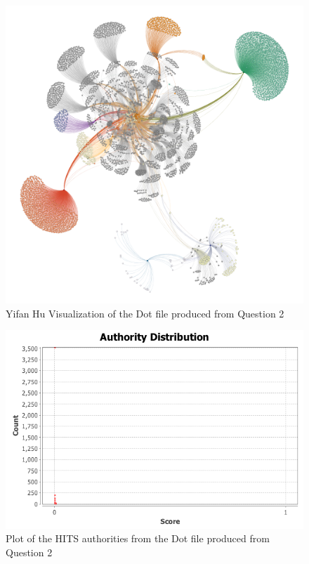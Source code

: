 \documentclass[letterpaper,11pt]{article}
\begin{document}
\begin{figure}[p]
\includegraphics[scale=0.4]{q3/Visualized/colorized-yifan-hu-visualized.png}
\caption{Yifan Hu Visualization of the Dot file produced from Question 2}
\label{fig:q3vis-yifan-hu}
\end{figure}

\begin{figure}[p]
\includegraphics[scale=0.5]{q3/HITS/authorities.png}
\caption{Plot of the HITS authorities from the Dot file produced from Question 2}
\label{fig:q3hits-authorities}
\end{figure}
\end{document}
